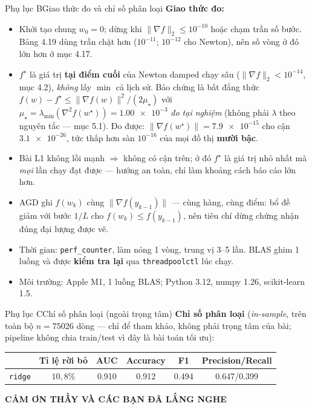 \documentclass[aspectratio=169,11pt]{beamer}
\newcommand{\wstar}{w^{\star}}
\newcommand{\norm}[1]{\lVert #1 \rVert}
\begin{document}
\begin{frame}{Phụ lục B}{Giao thức đo và chỉ số phân loại}
  \small
  \textbf{Giao thức đo:}
  \begin{itemize}
    \item Khởi tạo chung $w_0=0$; dừng khi $\norm{\nabla f}_2\le10^{-10}$ hoặc chạm trần số bước.
          Bảng 4.19 dùng trần chặt hơn ($10^{-11}$; $10^{-12}$ cho Newton), nên số vòng ở đó
          lớn hơn ở mục 4.17.
    \item $f^\star$ là giá trị \textbf{tại điểm cuối} của Newton damped chạy sâu
          ($\norm{\nabla f}_2<10^{-14}$, mục 4.2), \emph{không} lấy $\min$ cả lịch sử. Bảo chứng là bất đẳng thức
          $f(w)-f^\star\le\norm{\nabla f(w)}^2/(2\mu_\star)$ với $\mu_\star=\lambda_{\min}(\nabla^2f(\wstar))
          =\num{1.00e-3}$ \emph{đo tại nghiệm} (không phải $\lambda$ theo nguyên tắc --- mục 5.1).
          Đo được: $\norm{\nabla f(\wstar)}=\num{7.9e-15}$ cho cận $\num{3.1e-26}$, tức thấp hơn
          sàn $10^{-16}$ của mọi đồ thị \textbf{mười bậc}.
    \item Bài L1 không lồi mạnh $\Rightarrow$ không có cận trên; ở đó $f^\star$ là giá trị nhỏ nhất mà
          \emph{mọi} lần chạy đạt được --- hướng an toàn, chỉ làm khoảng cách báo cáo lớn hơn.
    \item AGD ghi $f(w_k)$ cùng $\norm{\nabla f(y_{k-1})}$ --- cùng hàng, cùng điểm: bổ đề giảm với
          bước $1/L$ cho $f(w_k)\le f(y_{k-1})$, nên tiêu chí dừng chứng nhận đúng đại lượng được vẽ.
    \item Thời gian: \texttt{perf\_counter}, làm nóng 1 vòng, trung vị 3--5 lần. BLAS ghim 1 luồng và
          được \textbf{kiểm tra lại} qua \texttt{threadpoolctl} lúc chạy.
    \item Môi trường: Apple M1, 1 luồng BLAS; Python 3.12, numpy 1.26, scikit-learn 1.5.
  \end{itemize}
\end{frame}

\begin{frame}{Phụ lục C}{Chỉ số phân loại (ngoài trọng tâm)}
  \small
  \textbf{Chỉ số phân loại} (\emph{in-sample}, trên toàn bộ $n=\num{75026}$ dòng — chỉ để tham khảo,
  không phải trọng tâm của bài; pipeline không chia train/test vì đây là bài toán tối ưu):
  \begin{center}\footnotesize
  \begin{tabular}{lccccc}
    \toprule
    & Tỉ lệ rời bỏ & AUC & Accuracy & F1 & Precision/Recall\\
    \midrule
    \texttt{ridge} & $10{,}8\%$ & \num{0.910} & \num{0.912} & \num{0.494} & \num{0.647}/\num{0.399}\\
    \bottomrule
  \end{tabular}
  \end{center}
\end{frame}

\begin{frame}[plain]
    \begin{center}
      {\Large\color{accent}\textbf{CẢM ƠN THẦY VÀ CÁC BẠN ĐÃ LẮNG NGHE}}
    \end{center}
\end{frame}
\end{document}
